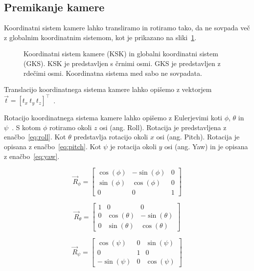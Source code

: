 \subsection{Premikanje kamere}
Koordinatni sistem kamere lahko transliramo in rotiramo tako, da ne sovpada več z globalnim koordinatnim sistemom, kot je prikazano na sliki~\ref{fig:premikanje-kamere}. 

\begin{figure}[htb]
\centering

\caption[Koordinatni sistem kamere in globalni koordinatni sistem]{Koordinatni sistem kamere (KSK) in globalni koordinatni sistem (GKS). KSK je predstavljen s črnimi osmi. GKS je predstavljen z rdečimi osmi. Koordinatna sistema med sabo ne sovpadata.}
\label{fig:premikanje-kamere}
\end{figure}

Translacijo koordinatnega sistema kamere lahko opišemo z vektorjem $\vec{t} = \left[t_x~t_y~t_z\right]^\top$~\cite{trucco1998introductory}. 

Rotacijo koordinatnega sistema kamere lahko opišemo z Eulerjevimi koti $\phi$, $\theta$ in $\psi$~\cite{bajd2011osnove}. S kotom $\phi$ rotiramo okoli $z$ osi (ang. Roll). Rotacija je predstavljena z enačbo~\eqref{eq:roll}. Kot $\theta$ predstavlja rotacijo okoli $x$ osi (ang. Pitch). Rotacija je opisana z enačbo~\eqref{eq:pitch}. Kot $\psi$ je rotacija okoli $y$ osi (ang. Yaw) in je opisana z enačbo~\eqref{eq:yaw}.

\begin{equation}
\vec{R}_\phi = \begin{bmatrix}
\cos(\phi) & - \sin(\phi) & 0 \\
\sin(\phi) & \cos(\phi) & 0 \\
0 & 0 & 1
\end{bmatrix}
\label{eq:roll}
\end{equation}

\begin{equation}
\vec{R}_\theta = \begin{bmatrix}
1 & 0 & 0 \\
0 & \cos(\theta) & - \sin(\theta) \\
0 & \sin(\theta) & \cos(\theta)
\end{bmatrix}
\label{eq:pitch}
\end{equation}

\begin{equation}
\vec{R}_\psi = \begin{bmatrix}
\cos(\psi) & 0 & \sin(\psi) \\
0 & 1 & 0 \\
- \sin(\psi) & 0 & \cos(\psi) 
\end{bmatrix}
\label{eq:yaw}
\end{equation}


